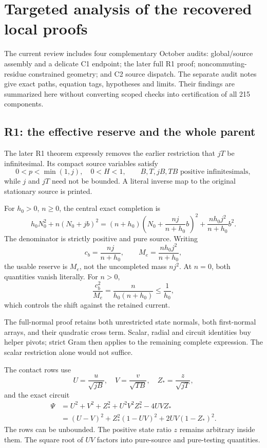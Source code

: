 \section{Targeted analysis of the recovered local proofs}

The current review includes four complementary October audits:
global/source assembly and a delicate C1 endpoint; the later full R1
proof; noncommuting-residue constrained geometry; and C2 source
dispatch. The separate audit notes give exact paths, equation tags,
hypotheses and limits. Their findings are summarized here without
converting scoped checks into certification of all 215 components.

\subsection{R1: the effective reserve and the whole parent}

The later R1 theorem expressly removes the earlier restriction that
\(jT\) be infinitesimal. Its compact source variables satisfy
\[
 0<p<\min(1,j),\quad 0<H<1,\qquad
 B,T,jB,TB\text{ positive infinitesimals},
\]
while \(j\) and \(jT\) need not be bounded. A literal inverse map to
the original stationary source is printed.

For \(h_0>0\), \(n\ge0\), the central exact completion is
\begin{equation}
 h_0N_0^2+n(N_0+jb)^2
 =(n+h_0)\left(N_0+\frac{nj}{n+h_0}b\right)^2
 +\frac{nh_0j^2}{n+h_0}b^2.
 \label{eq:effective}
\end{equation}
The denominator is strictly positive and pure source.
Writing
\[
 c_b=\frac{nj}{n+h_0},\qquad M_e=\frac{nh_0j^2}{n+h_0},
\]
the usable reserve is \(M_e\), not the uncompleted mass \(nj^2\).
At \(n=0\), both quantities vanish literally. For \(n>0\),
\[
 \frac{c_b^2}{M_e}=\frac{n}{h_0(n+h_0)}\le\frac1{h_0},
\]
which controls the shift against the retained current.

The full-normal proof retains both unrestricted state normals, both
first-normal arrays, and their quadratic cross term. Scalar, radial
and circuit identities buy helper pivots; strict Gram then applies
to the remaining complete expression. The scalar restriction alone
would not suffice. 

The contact rows use
\[
 U=\frac{u}{\sqrt{jB}},\quad V=\frac{v}{\sqrt{TB}},
 \quad Z_*=\frac{z}{\sqrt{jT}},
\]
and the exact circuit
\[
\begin{aligned}
 \Psi&=U^2+V^2+Z_*^2+U^2V^2Z_*^2-4UVZ_*\\
 &=(U-V)^2+Z_*^2(1-UV)^2+2UV(1-Z_*)^2.
\end{aligned}
\]
The rows can be unbounded. The positive state ratio \(z\) remains
arbitrary inside them. The square root of \(UV\) factors into
pure-source and pure-testing quantities.

